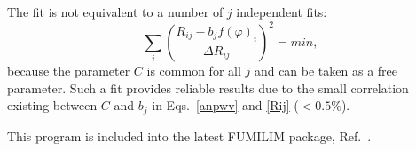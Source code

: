 \documentclass[epj]{svjour}
\begin{document}
The fit is not equivalent to a number of $j$ independent fits: 
\begin{equation}\label{anpwvs}
    \sum_{i} \left(\frac{R_{ij}-b_jf(\varphi)_i}{\Delta R_{ij}}\right)^2 = min, 
\end{equation}
because the parameter $C$ is common for all $j$ and can be taken as a free parameter.
Such a fit provides reliable results due to the small correlation existing  between $C$ and $b_j$ in Eqs.~\ref{anpwv} and \ref{Rij} ($<0.5$\%).

This program is included into the latest FUMILIM package, Ref.~\cite{Sitnik:2016xxx}.




%
%

\end{document}
